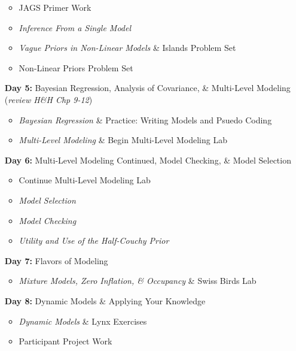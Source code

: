 \documentclass[11pt]{article}
\begin{document}
\begin{enumerate}
\begin{itemize}
\item JAGS Primer Work
\item \emph{Inference From a Single Model}  %
\item \emph{Vague Priors in Non-Linear Models} \& Islands Problem Set  %
\item Non-Linear Priors Problem Set  %
\end{itemize}

\item[\textbf{Day 5:}] Bayesian Regression, Analysis of Covariance, \& Multi-Level Modeling (\emph{review H\&H Chp 9-12})

\begin{itemize}
\item \emph{Bayesian Regression} \& Practice: Writing Models and Psuedo Coding %
\item \emph{Multi-Level Modeling} \& Begin Multi-Level Modeling Lab  %
\end{itemize}


\item[\textbf{Day 6:}] Multi-Level Modeling Continued, Model Checking, \& Model Selection

\begin{itemize}
\item  Continue Multi-Level Modeling Lab %
\item \emph{Model Selection}%
\item \emph{Model Checking}%
\item \emph{Utility and Use of the Half-Couchy Prior} %
\end{itemize}

\item[\textbf{Day 7:}] Flavors of Modeling

\begin{itemize}
\item \emph{Mixture Models, Zero Inflation, \& Occupancy} \& Swiss Birds Lab %
\end{itemize}

\item[\textbf{Day 8:}] Dynamic Models \& Applying Your Knowledge

\begin{itemize}
\item \emph{Dynamic Models} \& Lynx Exercises %
\item Participant Project Work
\end{itemize}


\end{enumerate}
\end{document}
